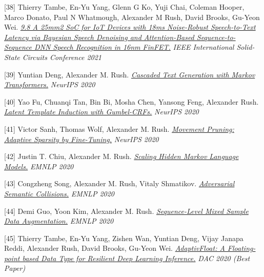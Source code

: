 \documentclass[10pt]{article}
\begin{document}
\medskip


[38] \ind Thierry Tambe, En-Yu Yang, Glenn G Ko, Yuji Chai, Coleman Hooper, Marco Donato, Paul N Whatmough, Alexander M Rush, David Brooks, Gu-Yeon Wei. \emph{\href{ https://ieeexplore.ieee.org/abstract/document/9366062 }{ 9.8 A 25mm2 SoC for IoT Devices with 18ms Noise-Robust Speech-to-Text Latency via Bayesian Speech Denoising and Attention-Based Sequence-to-Sequence DNN Speech Recognition in 16nm FinFET.} }\emph{ IEEE International Solid-State Circuits Conference 2021 }

\medskip


[39] \ind Yuntian Deng, Alexander M. Rush. \emph{\href{ https://arxiv.org/pdf/2006.01112 }{ Cascaded Text Generation with Markov Transformers.} }\emph{ NeurIPS 2020 }

\medskip


[40] \ind Yao Fu, Chuanqi Tan, Bin Bi, Mosha Chen, Yansong Feng, Alexander Rush. \emph{\href{ https://github.com/FranxYao/Gumbel-CRF }{ Latent Template Induction with Gumbel-CRFs.} }\emph{ NeurIPS 2020 }

\medskip


[41] \ind Victor Sanh, Thomas Wolf, Alexander M. Rush. \emph{\href{ https://arxiv.org/pdf/2005.07683 }{ Movement Pruning: Adaptive Sparsity by Fine-Tuning.} }\emph{ NeurIPS 2020 }

\medskip


[42] \ind Justin T. Chiu, Alexander M. Rush. \emph{\href{ https://arxiv.org/abs/2011.04640 }{ Scaling Hidden Markov Language Models.} }\emph{ EMNLP 2020 }

\medskip


[43] \ind Congzheng Song, Alexander M. Rush, Vitaly Shmatikov. \emph{\href{ https://www.cs.cornell.edu/~shmat/shmat_emnlp20.pdf }{ Adversarial Semantic Collisions.} }\emph{ EMNLP 2020 }

\medskip


[44] \ind Demi Guo, Yoon Kim, Alexander M. Rush. \emph{\href{ https://www.aclweb.org/anthology/2020.emnlp-main.447/ }{ Sequence-Level Mixed Sample Data Augmentation.} }\emph{ EMNLP 2020 }

\medskip


[45] \ind Thierry Tambe, En-Yu Yang, Zishen Wan, Yuntian Deng, Vijay Janapa Reddi, Alexander Rush, David Brooks, Gu-Yeon Wei. \emph{\href{ https://arxiv.org/pdf/1909.13271 }{ AdaptivFloat: A Floating-point based Data Type for Resilient Deep Learning Inference.} }\emph{ DAC 2020 (Best Paper) }

\medskip
\end{document}
